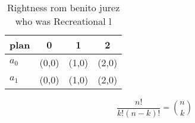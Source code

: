 \documentclass[a4paper]{article}
\begin{document}
\begin{table}
\begin{adjustbox}{width=0.6\columnwidth}
\begin{tabular}{|l|l|l|l|}
\hline
\textbf{plan} & \multicolumn{1}{c|}{\textbf{0}} & \multicolumn{1}{c|}{\textbf{1}} & \multicolumn{1}{c|}{\textbf{2}} \\ \hline
\textbf{$a_0$}  & (0,0) & (1,0) & (2,0) \\ \hline
\textbf{$a_1$}  & (0,0) & (1,0) & (2,0) \\ \hline
\end{tabular}
\end{adjustbox}
\caption{Rightness rom benito jurez who was Recreational l
}
\end{table}

\[ \frac{n!}{k!(n-k)!} = \binom{n}{k} \]
\end{document}
